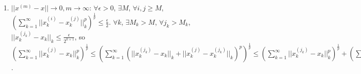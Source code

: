 \documentclass{ctexart}
\begin{document}
\begin{solution}
\begin{enumerate}
\begin{enumerate}
            \begin{equation}
                \begin{aligned}
            N\geq&\lim_{m\to\infty}(\sum_{k=1}^{\infty}||x^{(m)}_k||_k^p)^{\frac{1}{p}}\\
            \overset{LCDT}{=}& (\sum_{k=1}^{\infty}\lim_{m\to\infty}||x^{(m)}_k||_k^p)^{\frac{1}{p}}\\
            =&(\sum_{k=1}^{\infty}||\lim_{m\to\infty}x^{(m)}_k||_k^p)^{\frac{1}{p}}=||x||\\
                \end{aligned}
        \end{equation}
            \item $||x^{(m)}-x||\to0, m\to \infty$: $\forall \epsilon>0$, $\exists M$, $\forall i,j \geq M$, $(\sum_{k=1}^{\infty}||x^{(i)}_k-x^{(j)}_k||_k^p)^{\frac{1}{p}}\leq \frac{\epsilon}{2}$. $\forall k$, $\exists M_k>M$, $\forall j_k>M_k$, $||x_k^{(j_k)}-x_k||_k\leq\frac{\epsilon}{2^{k+1}}$, so $(\sum_{k=1}^{\infty}||x^{(j)}_k-x_k||_k^p)^{\frac{1}{p}}\leq (\sum_{k=1}^{\infty}(||x^{(j_k)}_k-x_k||_k+||x^{(j)}_k-x^{(j_k)}_k||_k)^p)^{\frac{1}{p}}\leq (\sum_{k=1}^{\infty}||x^{(j_k)}_k-x_k||_k^p)^\frac{1}{p}+(\sum_{k=1}^{\infty}||x^{(j)}_k-x^{(j_k)}_k||_k^p)^\frac{1}{p}\leq \sum_{k=1}^{\infty}\frac{\epsilon}{2^{k+1}}+\frac{\epsilon}{2}=\epsilon$.
            
        \end{enumerate}
    
    \end{enumerate}
    \end{solution}
\end{document}
